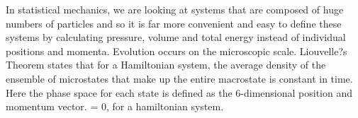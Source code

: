 In statistical mechanics, we are looking at systems that are composed of huge numbers of particles and so it is far more convenient and easy to define these systems by calculating pressure, volume and total energy instead of individual positions and momenta. Evolution occurs on the microscopic scale. Liouvelle?s Theorem states that for a Hamiltonian system, the average density of the ensemble of microstates that make up the entire macrostate is constant in time. Here the phase space for each state is defined as the 6-dimensional position and momentum vector.
 = 0, for a hamiltonian system.